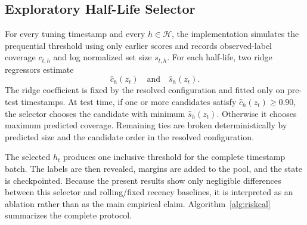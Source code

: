 \documentclass[10pt,twocolumn]{article}
\begin{document}
\subsection{Exploratory Half-Life Selector}

For every tuning timestamp and every \(h\in\mathcal{H}\), the implementation
simulates the prequential threshold using only earlier scores and records
observed-label coverage \(c_{t,h}\) and log normalized set size \(s_{t,h}\).
For each half-life, two ridge regressors estimate
\[
  \widehat{c}_h(z_t)
  \quad\text{and}\quad
  \widehat{s}_h(z_t).
\]
The ridge coefficient is fixed by the resolved configuration and fitted only on
pre-test timestamps. At test time, if one or more candidates satisfy
\(\widehat{c}_h(z_t)\geq 0.90\), the selector chooses the candidate with minimum
\(\widehat{s}_h(z_t)\). Otherwise it chooses maximum predicted coverage.
Remaining ties are broken deterministically by predicted size and the candidate
order in the resolved configuration.

The selected \(h_t\) produces one inclusive threshold for the complete
timestamp batch. The labels are then revealed, margins are added to the pool,
and the state is checkpointed. Because the present results show only negligible
differences between this selector and rolling/fixed recency baselines, it is
interpreted as an ablation rather than as the main empirical claim.
Algorithm~\ref{alg:riskcal} summarizes the complete protocol.
\end{document}
